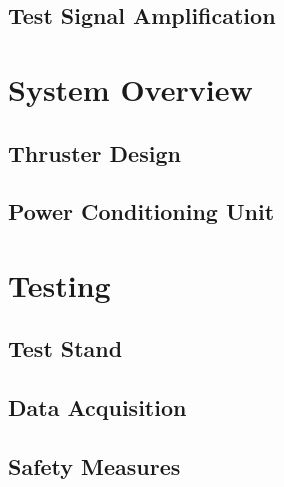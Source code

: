 \documentclass[journal]{IEEEtran}
\begin{document}
\subsection{Test Signal Amplification}

\section{System Overview}

\subsection{Thruster Design}

\subsection{Power Conditioning Unit}

\section{Testing}

\subsection{Test Stand}

\subsection{Data Acquisition}

\subsection{Safety Measures}
\end{document}

